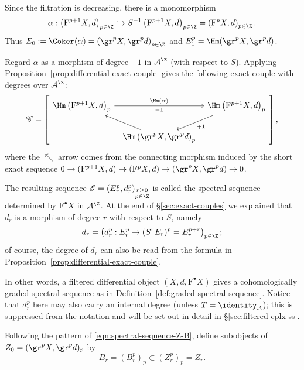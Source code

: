 Since the filtration is decreasing, there is a monomorphism
\[ \alpha:\left(\mathrm{F}^{p+1}X,d\right)_{p\in\Z}
	\hookrightarrow S^{-1}\left(\mathrm{F}^{p+1}X,d\right)_{p\in\Z}
	=\left(\mathrm{F}^{p}X,d\right)_{p\in\Z}. \]
Thus $E_0:=\Coker(\alpha)=\left(\gr^pX,\gr^pd\right)_{p\in\Z}$ and
$E_1^p=\Hm(\gr^pX,\gr^pd)$.

Regard $\alpha$ as a morphism of degree $-1$ in $\mathcal{A}^{\Z}$ (with
respect to $S$). Applying Proposition~\ref{prop:differential-exact-couple}
gives the following exact couple with degrees over $\mathcal{A}^{\Z}$:
\[\mathscr{C}=\left[\begin{tikzcd}[column sep=tiny]
	\Hm\left(\mathrm{F}^{p+1}X,d\right)_p
	\arrow[rr, "-1"', "{\Hm(\alpha)}"] & &
	\Hm\left(\mathrm{F}^{p+1}X,d\right)_p \arrow[ld, "{+1}"] \\
	& \Hm\left(\gr^pX,\gr^pd\right)_p \arrow[lu] &
\end{tikzcd}\right],\]
where the $\nwarrow$ arrow comes from the connecting morphism induced by the
short exact sequence
$0\to(\mathrm{F}^{p+1}X,d)\to(\mathrm{F}^pX,d)
\to(\gr^pX,\gr^pd)\to0$.

The resulting sequence
$\mathscr{E}=(E_r^p,d_r^p)_{\substack{r\geq0\\p\in\Z}}$ is called the
spectral sequence determined by $\mathrm{F}^\bullet X$ in
$\mathcal{A}^{\Z}$. At the end of \S\ref{sec:exact-couples} we explained that
$d_r$ is a morphism of degree $r$ with respect to $S$, namely
\[ d_r=\left(d_r^p:E_r^p\to(S^rE_r)^p=E_r^{p+r}\right)_{p\in\Z}; \]
of course, the degree of $d_r$ can also be read from the formula in
Proposition~\ref{prop:differential-exact-couple}.

In other words, a filtered differential object
$(X,d,\mathrm{F}^\bullet X)$ gives a cohomologically graded spectral sequence
as in Definition~\ref{def:graded-spectral-sequence}. Notice that $d_r^p$ here
may also carry an internal degree (unless $T=\identity_{\mathcal{A}}$); this is
suppressed from the notation and will be set out in detail in
\S\ref{sec:filtered-cplx-ss}.

Following the pattern of \eqref{eqn:spectral-sequence-Z-B}, define subobjects
of $Z_0=(\gr^pX,\gr^pd)_p$ by
\[ B_r=(B_r^p)_p\subset(Z_r^p)_p=Z_r. \]

